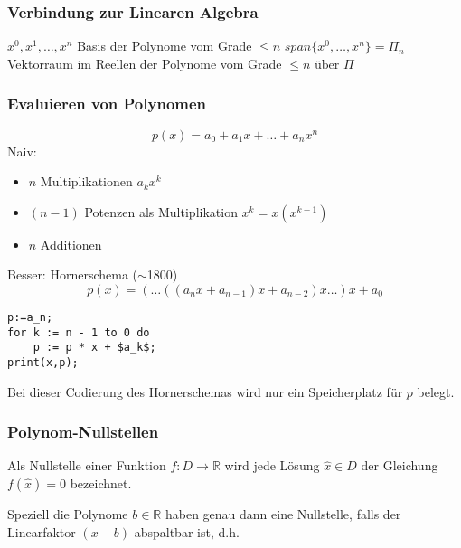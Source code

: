 \subsubsection{Verbindung zur Linearen Algebra} %
\label{ssub:polyLinAlg}
\( x^0,x^1,\ldots,x^n \) Basis der Polynome vom Grade \( \leq n \) \newline
\( span\{x^0 ,\ldots,x^n\}=\Pi_n \) Vektorraum im Reellen der Polynome vom Grade \( \leq n \text{ über } \Pi \)


\subsubsection{Evaluieren von Polynomen} %
\label{ssub:evaluieren_von_polynomen}

\[
	p(x)=a_0+a_1x+\ldots+a_nx^n
\]
Naiv:
\begin{itemize}
	\item \( n \) Multiplikationen \( a_kx^k \)
	\item \( (n-1) \) Potenzen als Multiplikation \( x^k=x(x^{k-1}) \)
	\item \( n \) Additionen
\end{itemize}

Besser: Hornerschema (\( \sim \)1800)
\[
	p(x)=(\ldots((a_nx+a_{n-1})x+a_{n-2})x\ldots)x+a_0
\]


\lstset{language=Pascal}
\begin{lstlisting}[frame=single,mathescape=true,caption="Codierung des Hornerschemas"] 
p:=a_n;
for k := n - 1 to 0 do
	p := p * x + $a_k$;
print(x,p);
\end{lstlisting}
Bei dieser Codierung des Hornerschemas wird nur ein Speicherplatz für \( p \) belegt.


\subsubsection{Polynom-Nullstellen} %
\label{ssub:polynom_nullstellen}

\begin{definition}
				Als Nullstelle einer Funktion \( f:D\rightarrow\mathbb{R} \) wird jede Lösung \( \hat{x} \in D \) der Gleichung \( f(\hat{x})=0 \) bezeichnet.
\end{definition}
\noindent Speziell die Polynome \( b \in \mathbb{R} \) haben genau dann eine Nullstelle, falls der Linearfaktor \( (x-b) \) abspaltbar ist, d.h.


